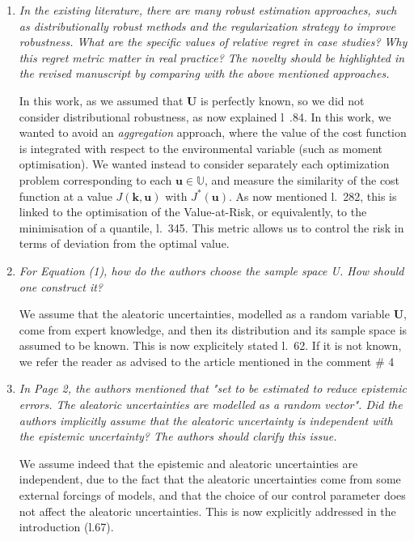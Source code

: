 \documentclass[a4paper,11pt]{article}
\begin{document}
\begin{enumerate}
\item\textit{In the existing literature, there are many robust estimation approaches, such as distributionally robust methods and the regularization strategy to improve robustness. What are the specific values of relative regret in case studies?} \textit{ Why this regret metric matter in real practice? The novelty should be highlighted in the revised manuscript by comparing with the above mentioned approaches.}

    In this work, as we assumed that $\mathbf{U}$ is perfectly known, so we did not consider distributional robustness, as now explained l~.84.
    In this work, we wanted to avoid an \emph{aggregation} approach, where the value of the cost function is integrated with respect to the environmental variable (such as moment optimisation).
    We wanted instead to consider separately each optimization problem corresponding to each $\mathbf{u}\in \mathbb{U}$, and measure the similarity of the cost function at a value $J(\mathbf{k},\mathbf{u})$ with $J^*(\mathbf{u})$. As now mentioned l.~282, this is linked to the optimisation of the Value-at-Risk, or equivalently, to the minimisation of a quantile, l.~345. This metric allows us to control the risk in terms of deviation from the optimal value.%


\item \textit{For Equation (1), how do the authors choose the sample space U. How should one construct it?}
  
We assume that the aleatoric uncertainties, modelled as a random variable $\mathbf{U}$, come from expert knowledge, and then its distribution and its sample space is assumed to be known. This is now explicitely stated l.~62. If it is not known, we refer the reader as advised to the article mentioned in the comment \# 4
\item \textit{In Page 2, the authors mentioned that "set to be estimated to reduce epistemic errors. The aleatoric uncertainties are modelled as a random vector". Did the authors implicitly assume that the aleatoric uncertainty is independent with the epistemic uncertainty? The authors should clarify this issue.}
  
  We assume indeed that the epistemic and aleatoric uncertainties are independent, due to the fact that the aleatoric uncertainties come from some external forcings of models, and that the choice of our control parameter does not affect the aleatoric uncertainties. This is now explicitly addressed in the introduction (l.67).
 

\end{enumerate}
\end{document}
